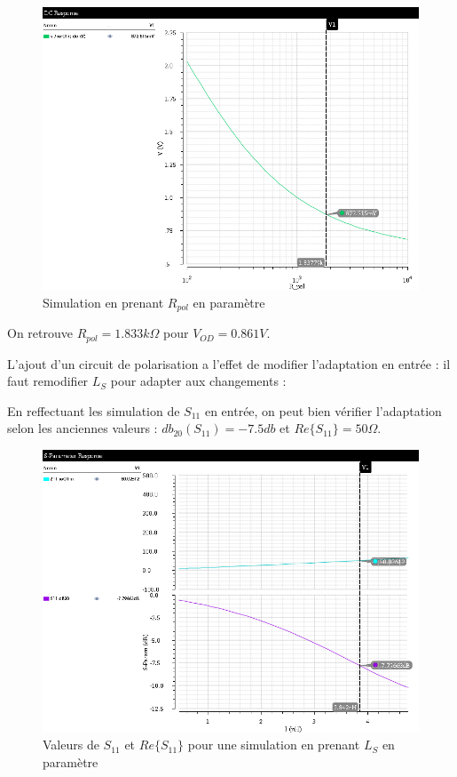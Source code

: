 \documentclass[a4paper]{article}
\begin{document}
\begin{figure}[!htb]
\begin{center}
  \includegraphics[scale=0.45]{Q3-Rpol-sweep.png}
  \caption{Simulation en prenant $R_{pol}$ en param\`etre}
  \label{schema-pol}
\end{center}
\end{figure}

On retrouve $R_{pol} = 1.833 k\Omega$ pour $V_{OD} = 0.861V$.

\clearpage
L'ajout d'un circuit de polarisation a l'effet de modifier l'adaptation en entr\'ee :
il faut remodifier $L_S$ pour adapter aux changements :

En reffectuant les simulation de $S_{11}$ en entr\'ee, on peut bien v\'erifier l'adaptation
selon les anciennes valeurs : $db_{20}(S_{11}) = -7.5 db$ et $Re\{S_{11}\} = 50 \Omega$.

\begin{figure}[!htb]
\begin{center}
  \includegraphics[scale=0.45]{Q3-newLs.png}
  \caption{Valeurs de $S_{11}$ et $Re\{S_{11}\}$ pour une simulation en prenant $L_S$ en param\`etre}
  \label{newLS}
\end{center}
\end{figure}
\end{document}
